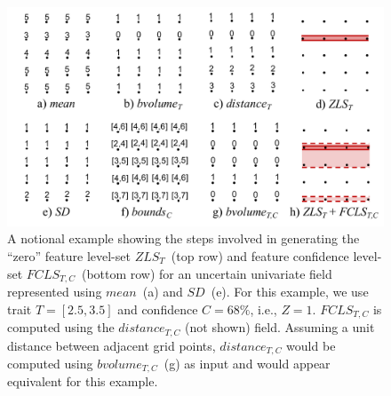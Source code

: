 \begin{figure}[!b]
\centering
\includegraphics[width=\linewidth, trim={1cm 0cm 0.33cm 0cm}, clip]{Images/example_narrow.pdf}
\caption{A notional example showing the steps involved in generating the ``zero'' feature level-set $ZLS_{T}$~(top row) and feature confidence level-set $FCLS_{T,C}$~(bottom row) for an uncertain univariate field represented using $mean$~(a) and $SD$~(e). 
%
For this example, we use trait $T=[2.5, 3.5]$ and confidence $C=68\%$, i.e., $Z=1$.
%
$FCLS_{T,C}$ is computed using the $distance_{T,C}$ (not shown) field.
%
Assuming a unit distance between adjacent grid points,
%
$distance_{T,C}$ would be computed using $bvolume_{T,C}$~(g) as input and would appear equivalent for this example.
}
\label{fig:example}
\end{figure}



